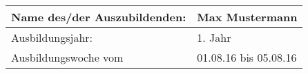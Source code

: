 \begin{center}
	\begin{tabular}{ | m{15em} | m{21em} | }
	\hline
	Name des/der Auszubildenden: & Max Mustermann \\ \hline
	Ausbildungsjahr: & 1. Jahr \\ \hline
	Ausbildungswoche vom & 01.08.16 bis 05.08.16 \\ \hline
	\end{tabular}
\end{center}